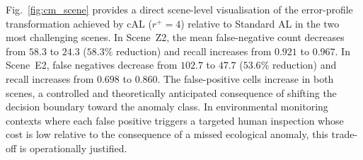 Fig.~\ref{fig:cm_scene} provides a direct scene-level visualisation of
the error-profile transformation achieved by cAL ($r^{+}=4$) relative
to Standard AL in the two most challenging scenes. In Scene~Z2, the
mean false-negative count decreases from $58.3$ to $24.3$ ($58.3\%$
reduction) and recall increases from $0.921$ to $0.967$. In Scene~E2,
false negatives decrease from $102.7$ to $47.7$ ($53.6\%$ reduction)
and recall increases from $0.698$ to $0.860$. The false-positive cells
increase in both scenes, a controlled and theoretically anticipated
consequence of shifting the decision boundary toward the anomaly class.
In environmental monitoring contexts where each false positive triggers
a targeted human inspection whose cost is low relative to the
consequence of a missed ecological anomaly, this trade-off is
operationally justified.


    \caption{Pixel-level anomaly detection maps for scenes Z2 (top) and
    E2 (bottom) at the final annotation budget (600 labeled superpixels;
    representative single run). Left: Mahalanobis baseline
    (Z2 FNR\,=\,0.143, E2 FNR\,=\,0.079).
    Centre: Standard AL ---
    Z2 FNR\,=\,0.079 (mean over 3~runs), E2 FNR\,=\,0.302.
    Right: cAL ($r^{+}=4$) ---
    Z2 FNR\,=\,0.033 ($\downarrow$58\%),
    E2 FNR\,=\,0.140 ($\downarrow$54\%).
    Green\,=\,TP (detected anomaly); Red\,=\,FN (missed anomaly);
    Blue\,=\,FP (false alarm); background\,=\,TN.}


